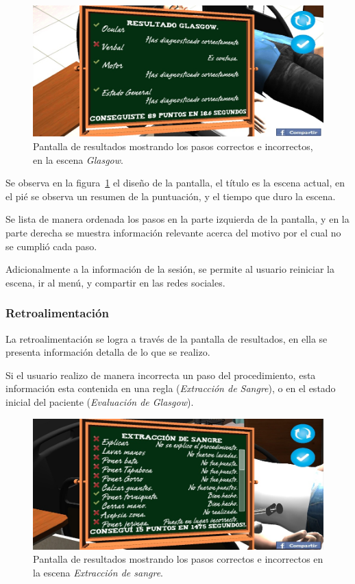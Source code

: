 \begin{figure}[H]
\centering
\includegraphics[scale=0.5]{propuesta/resultado_glasgow.jpg}
\caption{Pantalla de resultados mostrando los pasos correctos e incorrectos, en
    la escena \emph{Glasgow}.}
\label{fig:resultados_glasgow}
\end{figure}

Se observa en la figura~\ref{fig:resultados_glasgow} el diseño de la
pantalla, el título es la escena actual, en el pié se observa un resumen de la
puntuación, y el tiempo que duro la escena.

Se lista de manera ordenada los pasos en la parte izquierda de la pantalla, y en
la parte derecha se muestra información relevante acerca del motivo por el cual
no se cumplió cada paso.

Adicionalmente a la información de la sesión, se permite al usuario reiniciar la
escena, ir al menú, y compartir en las redes sociales.

\subsubsection{Retroalimentación}

La retroalimentación se logra a través de la pantalla de resultados, en ella se
presenta información detalla de lo que se realizo. 

Si el usuario realizo de manera incorrecta un paso del procedimiento, esta
información esta contenida en una regla (\emph{Extracción de Sangre}), o en el
estado inicial del paciente (\emph{Evaluación de Glasgow}).

\begin{figure}[H]
\centering
\includegraphics[scale=0.5]{propuesta/resultado_hemocultivo.jpg}
\caption{Pantalla de resultados mostrando los pasos correctos e incorrectos en
    la escena \emph{Extracción de sangre}.}
\label{fig:resultados_hemocultivo}
\end{figure}

